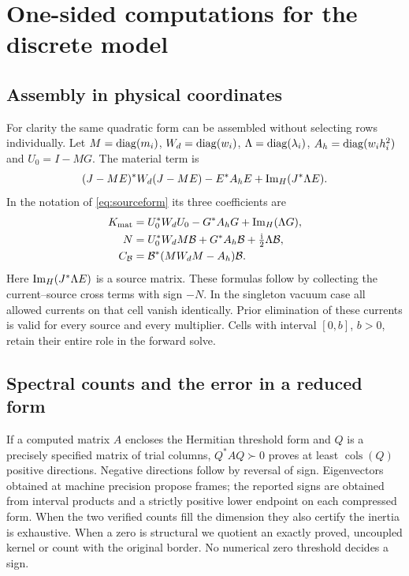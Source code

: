 \appendix
\section{One-sided computations for the discrete model}\label{app:bound}
\subsection{Assembly in physical coordinates}
For clarity the same quadratic form can be assembled without selecting rows individually. Let $M=\operatorname{diag}(m_i)$, $W_d=\operatorname{diag}(w_i)$, $\Lambda=\operatorname{diag}(\lambda_i)$, $A_h=\operatorname{diag}(w_i h_i^2)$ and $U_0=I-MG$. The material term is
\begin{equation}
 (J-ME)^*W_d(J-ME)-E^*A_h E+\operatorname{Im}_{H}(J^*\Lambda E).
\end{equation}
In the notation of \eqref{eq:sourceform} its three coefficients are
\begin{align}
 K_{\rm mat}&=U_0^*W_dU_0-G^*A_hG+\operatorname{Im}_{H}(\Lambda G),\notag\\
 N&=U_0^*W_dM\mathcal B+G^*A_h\mathcal B+\tfrac{\mathrm i}{2}\Lambda\mathcal B,\notag\\
 C_{\mathcal B}&=\mathcal B^*(M W_d M-A_h)\mathcal B .
 \label{eq:assemble}
\end{align}
Here $\operatorname{Im}_{H}(J^*\Lambda E)$ is a source matrix. These formulas follow by collecting the current--source cross terms with sign $-N$. In the singleton vacuum case all allowed currents on that cell vanish identically. Prior elimination of these currents is valid for every source and every multiplier. Cells with interval $[0,b]$, $b>0$, retain their entire role in the forward solve.

\subsection{Spectral counts and the error in a reduced form}
If a computed matrix $A$ encloses the Hermitian threshold form and $Q$ is a precisely specified matrix of trial columns, $Q^* A Q\succ0$ proves at least $\operatorname{cols}(Q)$ positive directions. Negative directions follow by reversal of sign. Eigenvectors obtained at machine precision propose frames; the reported signs are obtained from interval products and a strictly positive lower endpoint on each compressed form. When the two verified counts fill the dimension they also certify the inertia is exhaustive. When a zero is structural we quotient an exactly proved, uncoupled kernel or count with the original border. No numerical zero threshold decides a sign.

